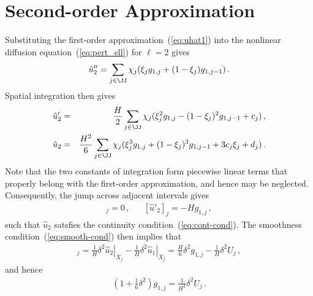 \documentclass[12pt,a5paper]{article}
\begin{document}
\section{Second-order Approximation}
Substituting the first-order approximation~(\ref{eq:uhat1}) into the
nonlinear diffusion equation~(\ref{eq:pert_ell}) for $\ell=2$ gives
\begin{eqnarray}
\hat{u}''_2 = \sum_{j\in\JJ}\chi_j(\xi_j g_{1,j}+(1-\xi_j)g_{1,j-1})\,.
\end{eqnarray}
Spatial integration then gives
\begin{eqnarray}
\hat{u}'_2 & = & \frac{H}{2}\sum_{j\in\JJ}\chi_j(\xi^2_j g_{1,j}
-(1-\xi_j)^2g_{1,j-1}+c_j)\,,
\\
\hat{u}_2 & = & \frac{H^2}{6}\sum_{j\in\JJ}\chi_j(\xi^3_j g_{1,j}
+(1-\xi_j)^3g_{1,j-1}+3c_j\xi_j+d_j)\,.
\end{eqnarray}
Note that the two constants of integration form 
piecewise linear terms that properly belong with the first-order
approximation, and hence may be neglected.
Consequently, the jump across adjacent intervals gives
\begin{eqnarray}
[\hat{u}_2]_j = 0\,, &&
[\hat{u}'_2]_j = -Hg_{1,j}\,,
\end{eqnarray}
such that $\hat{u}_2$ satsfies the continuity 
condition~(\ref{eq:cont-cond}). The smoothness 
condition~(\ref{eq:smooth-cond}) then implies that
\begin{eqnarray}
   [\hat{u}'_2]_j = 
\frac{1}{H}\left.\delta^{2}\hat{u}_2\right|_{X_j}
-\frac{1}{H}\left.\delta^{2}\hat{u}_1\right|_{X_j}
 = \frac{H}{6}\delta^2g_{1,j}
-\frac{1}{H}\delta^{2}U_j
\,,
\end{eqnarray}
and hence
\begin{eqnarray}
(1+\frac{1}{6}\delta^2)g_{1,j} = \frac{1}{H^2}\delta^2U_j\,.
\end{eqnarray}

\end{document}
